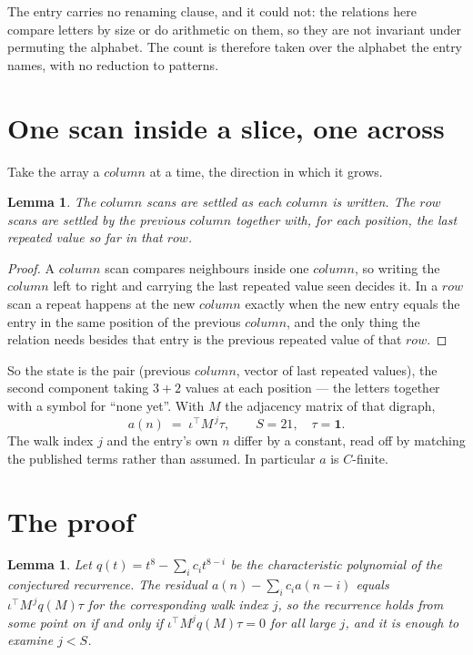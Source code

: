 \documentclass[11pt,a4paper]{article}
\theoremstyle{plain}
\newtheorem{lemma}[theorem]{Lemma}
\theoremstyle{definition}
\begin{document}
The entry carries no renaming clause, and it could not: the relations here compare letters by
size or do arithmetic on them, so they are not invariant under permuting the alphabet. The
count is therefore taken over the alphabet the entry names, with no reduction to patterns.

\section{One scan inside a slice, one across}

Take the array a $column$ at a time, the direction in which it grows.

\begin{lemma}\label{lem:state}
The $column$ scans are settled as each $column$ is written. The $row$ scans are
settled by the previous $column$ together with, for each position, the last repeated value
so far in that $row$.
\end{lemma}

\begin{proof}
A $column$ scan compares neighbours inside one $column$, so writing the
$column$ left to right and carrying the last repeated value seen decides it. In a
$row$ scan a repeat happens at the new $column$ exactly when the new entry equals the
entry in the same position of the previous $column$, and the only thing the relation needs
besides that entry is the previous repeated value of that $row$.
\end{proof}

So the state is the pair (previous $column$, vector of last repeated values), the second
component taking $3+2$ values at each position --- the letters together with a symbol for
``none yet''. With $M$ the adjacency matrix of that digraph,
\[
a(n)\;=\;\iota^{\!\top}M^{\,j}\tau ,\qquad S=21,\quad\tau=\mathbf{1} .
\]
The walk index $j$ and the entry's own $n$ differ by a constant, read off by matching the
published terms rather than assumed. In particular $a$ is $C$-finite.

\section{The proof}

\begin{lemma}\label{lem:crit}
Let $q(t)=t^{8}-\sum_i c_it^{8-i}$ be the characteristic polynomial of the
conjectured recurrence. The residual $a(n)-\sum_ic_ia(n-i)$ equals
$\iota^{\!\top}M^{\,j}q(M)\tau$ for the corresponding walk index $j$, so the recurrence
holds from some point on if and only if $\iota^{\!\top}M^{j}q(M)\tau=0$ for all large $j$,
and it is enough to examine $j<S$.
\end{lemma}
\end{document}
